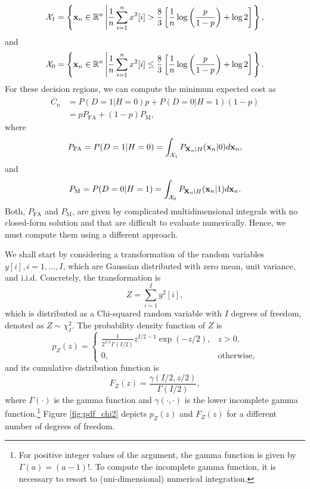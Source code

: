 \begin{equation*}
	{\cal X}_1 = \left\{{\mathbf x}_n \in \mathbb{R}^{n} \left| \frac{1}{n} \sum_{i = 1}^{n} x^2[i]  >  \frac{8}{3} \left[ \frac{1}{n}  \log \left(\frac{p}{1 - p}  \right) + \log 2 \right] \right. \right\},
\end{equation*}
and
\begin{equation*}
	{\cal X}_0 = \left\{{\mathbf x}_n \in \mathbb{R}^{n} \left| \frac{1}{n} \sum_{i = 1}^{n} x^2[i]  \leq \frac{8}{3} \left[ \frac{1}{n}  \log \left(\frac{p}{1 - p}  \right) + \log 2 \right] \right. \right\}.
\end{equation*}
For these decision regions, we can compute the minimum expected cost as
\begin{align*}
	\overline{C}_n &= P(D = 1 | H = 0) p +  P(D = 0 |H = 1) (1 - p) \\
	&= p P_{\text{FA}} + (1 - p) P_{\text{M}},
\end{align*}
where
\begin{equation*}
	P_{\text{FA}} = P(D = 1 | H = 0) = \int_{{\cal X}_1} P_{{\bf X}_n|H}({\bf x}_n|0) d {\bf x}_n,
\end{equation*}
and
\begin{equation*}
	P_{\text{M}} = P(D = 0 | H = 1) = \int_{{\cal X}_0} P_{{\bf X}_n|H}({\bf x}_n|1) d {\bf x}_n.
\end{equation*}
Both, $P_{\text{FA}}$ and $P_{\text{M}}$, are given by complicated multidimensional integrals with no closed-form solution and that are difficult to evaluate numerically. Hence, we must compute them using a different approach.

We shall start by considering a transformation of the random variables $y[i], i = 1, \ldots, I$, which are Gaussian distributed with zero mean, unit variance, and i.i.d. Concretely, the transformation is
\begin{equation*}
	Z = \sum_{i = 1}^{I} y^2[i],
\end{equation*}
which is distributed as a Chi-squared random variable with $I$ degrees of freedom, denoted as $Z \sim \chi^2_{I}$. The probability density function of $Z$ is
\begin{equation*}
	p_Z(z) = \begin{cases} \frac{1}{2^{I/2} \Gamma(I/2)} z^{I/2 - 1} \exp(-z/2), & z >0, \\ 0, & \text{otherwise,} \end{cases}
\end{equation*}
and its cumulative distribution function is
\begin{equation*}
	F_Z(z) = \frac{\gamma(I/2,z/2)}{\Gamma(I/2)},
\end{equation*}
where $\Gamma(\cdot)$ is the gamma function and $\gamma(\cdot,\cdot)$ is the lower incomplete gamma function.\footnote{For positive integer values of the argument, the gamma function is given by $\Gamma(a) = (a - 1)!$. To compute the incomplete gamma function, it is necessary to resort to (uni-dimensional) numerical integration.} Figure \ref{fig:pdf_chi2} depicts $p_Z(z)$ and $F_Z(z)$ for a different number of degrees of freedom.

